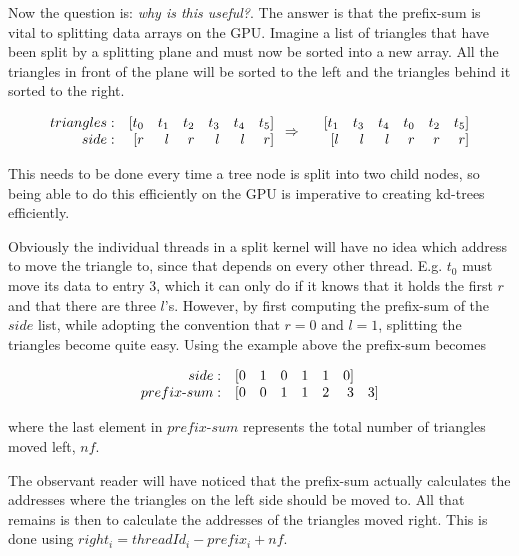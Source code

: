 
Now the question is: \textit{why is this useful?}. The answer is that
the prefix-sum is vital to splitting data arrays on the GPU. Imagine a
list of triangles that have been split by a splitting plane and must
now be sorted into a new array. All the triangles in front of the
plane will be sorted to the left and the triangles behind it sorted to
the right.

\begin{displaymath}
  \begin{array} {r r r r r r r}
    triangles: & [t_0 & t_1 & t_2 & t_3 & t_4 & t_5]\\
    side: & [r & l & r & l & l & r]\\
  \end{array}
  \Rightarrow
  \begin{array} {r r r r r r r}
    &[t_1 & t_3 & t_4 & t_0 & t_2 & t_5]\\
    &[l & l & l & r & r & r]\\
  \end{array}
\end{displaymath}

This needs to be done every time a tree node is split into two child nodes, so
being able to do this efficiently on the GPU is imperative to creating kd-trees
efficiently.

Obviously the individual threads in a split kernel will have no idea which
address to move the triangle to, since that depends on every other
thread. E.g. $t_0$ must move its data to entry 3, which it can only do if it
knows that it holds the first $r$ and that there are three $l$'s. However, by
first computing the prefix-sum of the $side$ list, while adopting the convention
that $r = 0$ and $l = 1$, splitting the triangles become quite easy. Using the
example above the prefix-sum becomes

\begin{displaymath}
  \begin{array} {r r r r r r r r}
    side: & [0 & 1 & 0 & 1 & 1 & 0]\\
    prefix\text{-}sum: & [0 & 0 & 1 & 1 & 2 & 3 & 3]
  \end{array}
\end{displaymath}

where the last element in $prefix\text{-}sum$ represents the total number of
triangles moved left, $nf$.

The observant reader will have noticed that the prefix-sum actually
calculates the addresses where the triangles on the left side should
be moved to. All that remains is then to calculate the addresses of
the triangles moved right. This is done using $right_i = threadId_i -
prefix_i + nf$.

